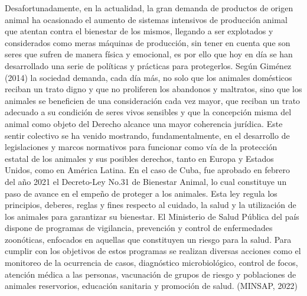 Desafortunadamente, en la actualidad, la gran demanda de productos de origen animal ha ocasionado el aumento de sistemas intensivos de producción animal que atentan contra el bienestar de los mismos, llegando a ser explotados y considerados como meras máquinas de producción, sin tener en cuenta que son seres que sufren de manera física y emocional, es por ello que hoy en día se han desarrollado una serie de políticas y prácticas para protegerlos.
Según Giménez (2014) la sociedad demanda, cada día más, no solo que los animales domésticos reciban un trato digno y que no proliferen los abandonos y maltratos, sino que los animales se beneficien de una consideración cada vez mayor, que reciban un trato adecuado a su condición de seres vivos sensibles y que la concepción misma del animal como objeto del Derecho alcance una mayor coherencia jurídica. 
Este sentir colectivo se ha venido mostrando, fundamentalmente, en el desarrollo de legislaciones y marcos normativos para funcionar como vía de la protección estatal de los animales y sus posibles derechos, tanto en Europa y Estados Unidos, como en América Latina. 
En el caso de Cuba, fue aprobado en febrero del año 2021 el Decreto-Ley No.31 de Bienestar Animal, lo cual constituye un paso de avance en el empeño de proteger a los animales. Esta ley regula los principios, deberes, reglas y fines respecto al cuidado, la salud y la utilización de los animales para garantizar su bienestar. El Ministerio de Salud Pública del país dispone de programas de vigilancia, prevención y control de enfermedades zoonóticas, enfocados en aquellas que constituyen un riesgo para la salud. Para cumplir con los objetivos de estos programas se realizan diversas acciones como el monitoreo de la ocurrencia de casos, diagnóstico microbiológico, control de focos, atención médica a las personas, vacunación de grupos de riesgo y poblaciones de animales reservorios, educación sanitaria y promoción de salud. (MINSAP, 2022)
